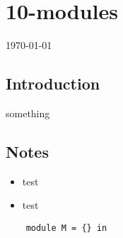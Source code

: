 \documentclass[12pt]{article}
\begin{document}
\section*{10-modules}
\today
\subsection*{Introduction}
something
\subsection*{Notes}
\begin{itemize}
    \item test
    \item test
\end{itemize}
\begin{verbatim}
    module M = {} in
\end{verbatim}
\end{document}
